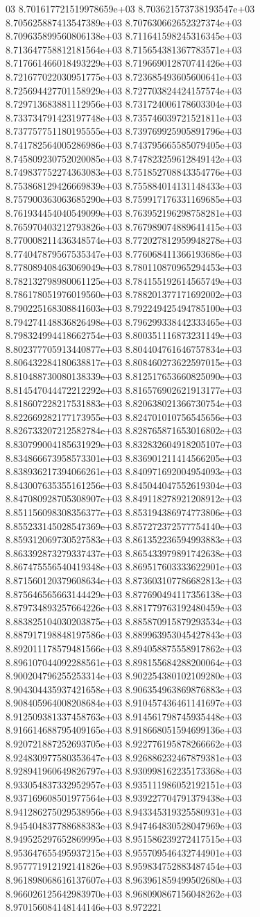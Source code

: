 03	8.701617721519978659e+03	8.703621573738193547e+03	8.705625887413547389e+03	8.707630662652327374e+03	8.709635899560806138e+03	8.711641598245316345e+03	8.713647758812181564e+03	8.715654381367783571e+03	8.717661466018493229e+03	8.719669012870741426e+03	8.721677022030951775e+03	8.723685493605600641e+03	8.725694427701158929e+03	8.727703824424157574e+03	8.729713683881112956e+03	8.731724006178603304e+03	8.733734791423197748e+03	8.735746039721521811e+03	8.737757751180195555e+03	8.739769925905891796e+03	8.741782564005286986e+03	8.743795665585079405e+03	8.745809230752020085e+03	8.747823259612849142e+03	8.749837752274363083e+03	8.751852708843354776e+03	8.753868129426669839e+03	8.755884014131148433e+03	8.757900363063685290e+03	8.759917176331169685e+03	8.761934454040549099e+03	8.763952196298758281e+03	8.765970403212793826e+03	8.767989074889641415e+03	8.770008211436348574e+03	8.772027812959948278e+03	8.774047879567535347e+03	8.776068411366193686e+03	8.778089408463069049e+03	8.780110870965294453e+03	8.782132798980061125e+03	8.784155192614565749e+03	8.786178051976019560e+03	8.788201377171692002e+03	8.790225168308841603e+03	8.792249425494785100e+03	8.794274148836826498e+03	8.796299338442333465e+03	8.798324994418662754e+03	8.800351116873231149e+03	8.802377705913440877e+03	8.804404761646757834e+03	8.806432284180638817e+03	8.808460273622597015e+03	8.810488730080138339e+03	8.812517653660825090e+03	8.814547044472212292e+03	8.816576902621913177e+03	8.818607228217531883e+03	8.820638021366730754e+03	8.822669282177173955e+03	8.824701010756545656e+03	8.826733207212582784e+03	8.828765871653016802e+03	8.830799004185631929e+03	8.832832604918205107e+03	8.834866673958573301e+03	8.836901211414566205e+03	8.838936217394066261e+03	8.840971692004954093e+03	8.843007635355161256e+03	8.845044047552619304e+03	8.847080928705308907e+03	8.849118278921208912e+03	8.851156098308356377e+03	8.853194386974773806e+03	8.855233145028547369e+03	8.857272372577754140e+03	8.859312069730527583e+03	8.861352236594993883e+03	8.863392873279337437e+03	8.865433979891742638e+03	8.867475556540419348e+03	8.869517603333622901e+03	8.871560120379608634e+03	8.873603107786682813e+03	8.875646565663144429e+03	8.877690494117356138e+03	8.879734893257664226e+03	8.881779763192480459e+03	8.883825104030203875e+03	8.885870915879293534e+03	8.887917198848197586e+03	8.889963953045427843e+03	8.892011178579481566e+03	8.894058875558917862e+03	8.896107044092288561e+03	8.898155684288200064e+03	8.900204796255253314e+03	8.902254380102109280e+03	8.904304435937421658e+03	8.906354963869876883e+03	8.908405964008208684e+03	8.910457436461141697e+03	8.912509381337458763e+03	8.914561798745935448e+03	8.916614688795409165e+03	8.918668051594699136e+03	8.920721887252693705e+03	8.922776195878266662e+03	8.924830977580353647e+03	8.926886232467879381e+03	8.928941960649826797e+03	8.930998162235173368e+03	8.933054837332952957e+03	8.935111986052192151e+03	8.937169608501977564e+03	8.939227704791379438e+03	8.941286275029538956e+03	8.943345319325580931e+03	8.945404837788688383e+03	8.947464830528047969e+03	8.949525297652869995e+03	8.951586239272417515e+03	8.953647655495937215e+03	8.955709546432744901e+03	8.957771912192141826e+03	8.959834752883487454e+03	8.961898068616137607e+03	8.963961859499502680e+03	8.966026125642983970e+03	8.968090867156048262e+03	8.970156084148144146e+03	8.972221